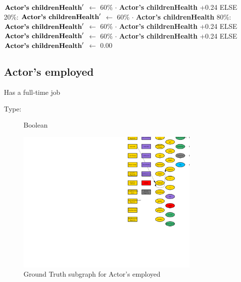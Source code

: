 \documentclass{article}%
\begin{document}
\begin{flushleft}
$\mbox{\textbf{Actor's childrenHealth}} '$%
$\leftarrow$%
60\%%
$\cdot$%
\textbf{Actor's childrenHealth}%
+0.24%
\linebreak%
\hspace*{6em}%
ELSE %
\linebreak%
\hspace*{8em}%
20\%: %
$\mbox{\textbf{Actor's childrenHealth}} '$%
$\leftarrow$%
60\%%
$\cdot$%
\textbf{Actor's childrenHealth}%
\linebreak%
\hspace*{8em}%
80\%: %
$\mbox{\textbf{Actor's childrenHealth}} '$%
$\leftarrow$%
60\%%
$\cdot$%
\textbf{Actor's childrenHealth}%
+0.24%
\linebreak%
\hspace*{4em}%
ELSE %
$\mbox{\textbf{Actor's childrenHealth}} '$%
$\leftarrow$%
60\%%
$\cdot$%
\textbf{Actor's childrenHealth}%
+0.24%
\linebreak%
\hspace*{2em}%
ELSE %
$\mbox{\textbf{Actor's childrenHealth}} '$%
$\leftarrow$%
0.00%
\end{flushleft}

%
\subsection{Actor's employed}%
\label{subsec:Actor's employed}%
Has a full{-}time job%
\begin{description}%
\item[Type:]%
Boolean%
\end{description}%


\begin{figure}[ht]%
\centering%
\includegraphics[width=0.8\textwidth]{images/employedOfActor.png}%
\caption{Ground Truth subgraph for Actor's employed}%
\end{figure}
\end{document}
